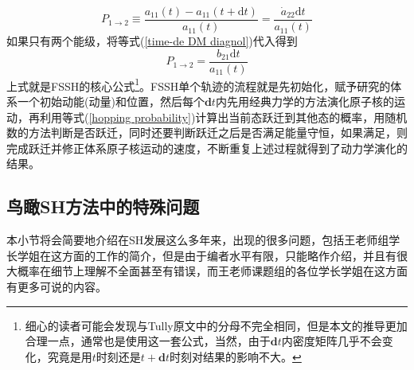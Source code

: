 \documentclass{article}
\numberwithin{equation}{section}
\begin{document}
        \begin{equation}
          P_{1\rightarrow2}\equiv\frac{a_{11}(t)-a_{11}(t+\mathrm{d}t)}{a_{11}(t)}=\frac{\dot{a}_{22} \mathrm{d}t }{ a_{11}(t)}
        \end{equation}
        如果只有两个能级，将等式(\ref{time-de DM diagnol})代入得到
        \begin{equation}
          P_{1\rightarrow2}=\frac{b_{21} \mathrm{d}t }{ a_{11}(t)}
          \label{hopping probability}
        \end{equation}
        上式就是FSSH的核心公式\footnote{细心的读者可能会发现与Tully原文中的分母不完全相同，但是本文的推导更加合理一点，通常也是使用这一套公式，当然，由于$\mathbf{d}t$内密度矩阵几乎不会变化，究竟是用$t$时刻还是$t+\mathbf{d}t$时刻对结果的影响不大。}。FSSH单个轨迹的流程就是先初始化，赋予研究的体系一个初始动能(动量)和位置，然后每个$\mathbf{d}t$内先用经典力学的方法演化原子核的运动，再利用等式(\ref{hopping probability})计算出当前态跃迁到其他态的概率，用随机数的方法判断是否跃迁，同时还要判断跃迁之后是否满足能量守恒，如果满足，则完成跃迁并修正体系原子核运动的速度，不断重复上述过程就得到了动力学演化的结果。
        
      \subsection{鸟瞰SH方法中的特殊问题}
        本小节将会简要地介绍在SH发展这么多年来，出现的很多问题，包括王老师组学长学姐在这方面的工作的简介，但是由于编者水平有限，只能略作介绍，并且有很大概率在细节上理解不全面甚至有错误，而王老师课题组的各位学长学姐在这方面有更多可说的内容。
\end{document}

